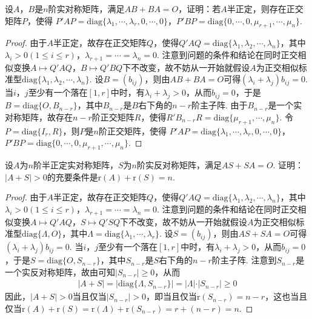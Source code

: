 \documentclass[../../main.tex]{subfiles}%
\begin{document}
\begin{proposition}\label{proposition:例9.70}
设\(A\)，\(B\)是\(n\)阶实对称矩阵，满足\(AB + BA = O\)，证明：若\(A\)半正定，则存在正交矩阵\(P\)，使得
\(P'AP=\mathrm{diag}\{\lambda_1,\cdots,\lambda_r,0,\cdots,0\}\)，\(P'BP=\mathrm{diag}\{0,\cdots,0,\mu_{r + 1},\cdots,\mu_n\}\).
\end{proposition}
\begin{proof}

由于\(A\)半正定，故存在正交矩阵\(Q\)，使得\(Q'AQ=\mathrm{diag}\{\lambda_1,\lambda_2,\cdots,\lambda_n\}\)，其中\(\lambda_i>0(1\leqslant  i\leqslant  r)\)，\(\lambda_{r + 1}=\cdots=\lambda_n = 0\). 注意到问题的条件和结论在同时正交相似变换\(A\mapsto Q'AQ\)，\(B\mapsto Q'BQ\)下不改变，故不妨从一开始就假设\(A\)为正交相似标准型\(\mathrm{diag}\{\lambda_1,\lambda_2,\cdots,\lambda_n\}\). 设\(B=(b_{ij})\)，则由\(AB + BA = O\)可得\((\lambda_i + \lambda_j)b_{ij}=0\). 当\(i\)，\(j\)至少有一个落在\([1,r]\)中时，有\(\lambda_i + \lambda_j>0\)，从而\(b_{ij}=0\)，于是\(B=\mathrm{diag}\{O,B_{n - r}\}\)，其中\(B_{n - r}\)是\(B\)右下角的\(n - r\)阶主子阵. 由于\(B_{n - r}\)是一个实对称矩阵，故存在\(n - r\)阶正交矩阵\(R\)，使得\(R'B_{n - r}R=\mathrm{diag}\{\mu_{r + 1},\cdots,\mu_n\}\). 令\(P=\mathrm{diag}\{I_r,R\}\)，则\(P\)是\(n\)阶正交矩阵，使得
\(P'AP=\mathrm{diag}\{\lambda_1,\cdots,\lambda_r,0,\cdots,0\}\)，\(P'BP=\mathrm{diag}\{0,\cdots,0,\mu_{r + 1},\cdots,\mu_n\}\).

\end{proof}

\begin{proposition}\label{proposition:例9.71}
设\(A\)为\(n\)阶半正定实对称矩阵，\(S\)为\(n\)阶实反对称矩阵，满足\(AS + SA = O\). 证明：\(\vert A + S\vert>0\)的充要条件是\(\mathrm{r}(A)+\mathrm{r}(S)=n\).
\end{proposition}
\begin{proof}

由于\(A\)半正定，故存在正交矩阵\(Q\)，使得\(Q'AQ=\mathrm{diag}\{\lambda_1,\lambda_2,\cdots,\lambda_n\}\)，其中\(\lambda_i>0(1\leqslant  i\leqslant  r)\)，\(\lambda_{r + 1}=\cdots=\lambda_n = 0\). 注意到问题的条件和结论在同时正交相似变换\(A\mapsto Q'AQ\)，\(S\mapsto Q'SQ\)下不改变，故不妨从一开始就假设\(A\)为正交相似标准型\(\mathrm{diag}\{\Lambda,O\}\)，其中\(\Lambda=\mathrm{diag}\{\lambda_1,\cdots,\lambda_r\}\). 设\(S=(b_{ij})\)，则由\(AS + SA = O\)可得\((\lambda_i + \lambda_j)b_{ij}=0\). 当\(i\)，\(j\)至少有一个落在\([1,r]\)中时，有\(\lambda_i + \lambda_j>0\)，从而\(b_{ij}=0\)，于是\(S=\mathrm{diag}\{O,S_{n - r}\}\)，其中\(S_{n - r}\)是\(S\)右下角的\(n - r\)阶主子阵. 注意到\(S_{n - r}\)是一个实反对称矩阵，故由可知\(\vert S_{n - r}\vert\geqslant 0\)，从而
\begin{align*}
\vert A + S\vert=\vert\mathrm{diag}\{\Lambda,S_{n - r}\}\vert=\vert\Lambda\vert\cdot\vert S_{n - r}\vert\geqslant 0
\end{align*}
因此，\(\vert A + S\vert>0\)当且仅当\(\vert S_{n - r}\vert>0\)，即当且仅当\(\mathrm{r}(S_{n - r})=n - r\)，这也当且仅当\(\mathrm{r}(A)+\mathrm{r}(S)=\mathrm{r}(\Lambda)+\mathrm{r}(S_{n - r})=r+(n - r)=n\).

\end{proof}
\end{document}
